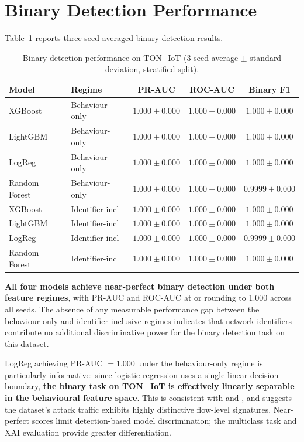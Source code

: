 \documentclass[12pt,a4paper]{report}
\begin{document}
\section{Binary Detection Performance}
\label{sec:binary-results}

Table~\ref{tab:binary} reports three-seed-averaged binary detection results.

\begin{table}[H]
\centering
\caption{Binary detection performance on TON\_IoT (3-seed average $\pm$ standard deviation, stratified split).}
\label{tab:binary}
\begin{tabular}{llccc}
\toprule
\textbf{Model} & \textbf{Regime} & \textbf{PR-AUC} & \textbf{ROC-AUC} & \textbf{Binary F1} \\
\midrule
XGBoost & Behaviour-only & $1.000 \pm 0.000$ & $1.000 \pm 0.000$ & $1.000 \pm 0.000$ \\
LightGBM & Behaviour-only & $1.000 \pm 0.000$ & $1.000 \pm 0.000$ & $1.000 \pm 0.000$ \\
LogReg & Behaviour-only & $1.000 \pm 0.000$ & $1.000 \pm 0.000$ & $1.000 \pm 0.000$ \\
Random Forest & Behaviour-only & $1.000 \pm 0.000$ & $1.000 \pm 0.000$ & $0.9999 \pm 0.000$ \\
\midrule
XGBoost & Identifier-incl & $1.000 \pm 0.000$ & $1.000 \pm 0.000$ & $1.000 \pm 0.000$ \\
LightGBM & Identifier-incl & $1.000 \pm 0.000$ & $1.000 \pm 0.000$ & $1.000 \pm 0.000$ \\
LogReg & Identifier-incl & $1.000 \pm 0.000$ & $1.000 \pm 0.000$ & $0.9999 \pm 0.000$ \\
Random Forest & Identifier-incl & $1.000 \pm 0.000$ & $1.000 \pm 0.000$ & $1.000 \pm 0.000$ \\
\bottomrule
\end{tabular}
\end{table}

\textbf{All four models achieve near-perfect binary detection under both feature regimes}, with PR-AUC and ROC-AUC at or rounding to 1.000 across all seeds. The absence of any measurable performance gap between the behaviour-only and identifier-inclusive regimes indicates that network identifiers contribute no additional discriminative power for the binary detection task on this dataset.

LogReg achieving PR-AUC $= 1.000$ under the behaviour-only regime is particularly informative: since logistic regression uses a single linear decision boundary, \textbf{the binary task on TON\_IoT is effectively linearly separable in the behavioural feature space}. This is consistent with \cite{alsaedi2020} and \cite{moustafa2021}, and suggests the dataset's attack traffic exhibits highly distinctive flow-level signatures. Near-perfect scores limit detection-based model discrimination; the multiclass task and XAI evaluation provide greater differentiation.
\end{document}
